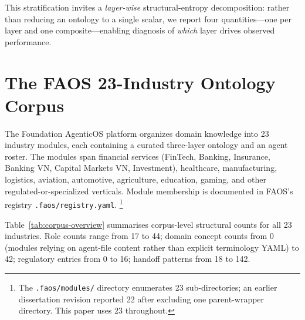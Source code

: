 \documentclass[11pt,a4paper]{article}
\newcommand{\faos}{\textsc{FAOS}}
\begin{document}
This stratification invites a \emph{layer-wise} structural-entropy
decomposition: rather than reducing an ontology to a single scalar, we
report four quantities---one per layer and one composite---enabling
diagnosis of \emph{which} layer drives observed performance.

\section{The \faos{} 23-Industry Ontology Corpus}
\label{sec:corpus}

The Foundation AgenticOS platform organizes domain knowledge into 23
industry modules, each containing a curated three-layer ontology and an
agent roster. The modules span financial services (FinTech, Banking,
Insurance, Banking VN, Capital Markets VN, Investment), healthcare,
manufacturing, logistics, aviation, automotive, agriculture, education,
gaming, and other regulated-or-specialized verticals. Module membership
is documented in \faos{}'s registry \texttt{.faos/registry.yaml}.%
\footnote{The \texttt{.faos/modules/} directory enumerates 23
sub-directories; an earlier dissertation revision reported 22 after
excluding one parent-wrapper directory. This paper uses 23 throughout.}

Table~\ref{tab:corpus-overview} summarises corpus-level structural
counts for all 23 industries. Role counts range from 17 to 44; domain
concept counts from 0 (modules relying on agent-file content rather than
explicit terminology YAML) to 42; regulatory entries from 0 to 16;
handoff patterns from 18 to 142.
\end{document}
